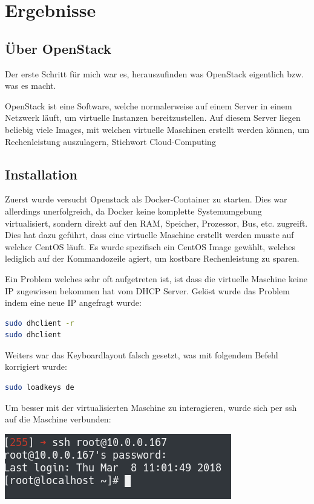 
\section{Ergebnisse}
\label{sec:Ergebnisse}
\subsection{Über OpenStack}
Der erste Schritt für mich war es, herauszufinden was OpenStack eigentlich bzw. was es macht.

OpenStack ist eine Software, welche normalerweise auf einem Server in einem Netzwerk läuft, um virtuelle Instanzen bereitzustellen. Auf diesem Server liegen beliebig viele Images, mit welchen virtuelle Maschinen erstellt werden können, um Rechenleistung auszulagern, Stichwort \glqq Cloud-Computing\grqq
\subsection{Installation}
Zuerst wurde versucht Openstack als Docker-Container zu starten. Dies war allerdings unerfolgreich, da Docker keine komplette Systemumgebung virtualisiert, sondern direkt auf den RAM, Speicher, Prozessor, Bus, etc. zugreift. Dies hat dazu geführt, dass eine virtuelle Maschine erstellt werden musste auf welcher CentOS läuft. Es wurde spezifisch ein CentOS Image gewählt, welches lediglich auf der Kommandozeile agiert, um kostbare Rechenleistung zu sparen. 

Ein Problem welches sehr oft aufgetreten ist, ist dass die virtuelle Maschine keine IP zugewiesen bekommen hat vom DHCP Server. Gelöst wurde das Problem indem eine neue IP angefragt wurde:

\begin{lstlisting}[language=bash]
sudo dhclient -r
sudo dhclient
\end{lstlisting}

Weiters war das Keyboardlayout falsch gesetzt, was mit folgendem Befehl korrigiert wurde:

\begin{lstlisting}[language=bash]
sudo loadkeys de
\end{lstlisting}

Um besser mit der virtualisierten Maschine zu interagieren, wurde sich per ssh auf die Maschine verbunden:

\begin{minipage}{\linewidth}
	\centering
	\includegraphics[width=0.8\linewidth]{images/ssh}
\end{minipage}

